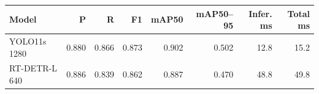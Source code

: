 \begin{tabular}{lrrrrrrr}
\hline
Model & P & R & F1 & mAP50 & mAP50--95 & Infer. ms & Total ms \\
\hline
YOLO11s 1280 & 0.880 & 0.866 & 0.873 & 0.902 & 0.502 & 12.8 & 15.2 \\
RT-DETR-L 640 & 0.886 & 0.839 & 0.862 & 0.887 & 0.470 & 48.8 & 49.8 \\
\hline
\end{tabular}
